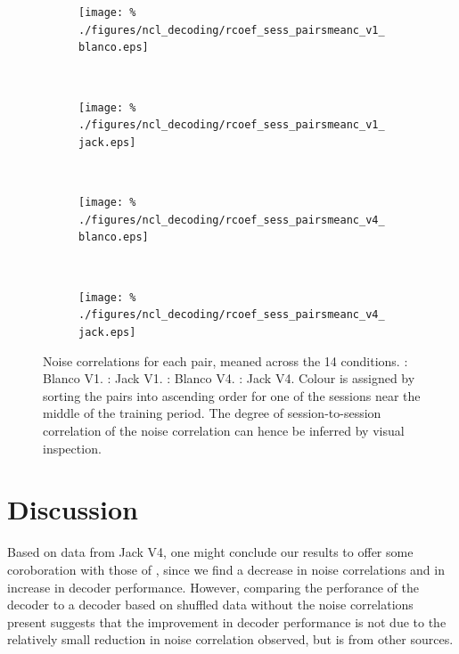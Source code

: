 \begin{figure}[htbp]
    \begin{subfigure}[b]{0.5\linewidth}
        \centering
        \caption{}
        \label{fig:noise_r_b1_pmc}
        \texttt{[image: \%
./figures/ncl\_decoding/rcoef\_sess\_pairsmeanc\_v1\_blanco.eps]}
    \end{subfigure}
    ~~
    \begin{subfigure}[b]{0.5\linewidth}
        \centering
        \caption{}
        \label{fig:noise_r_j1_pmc}
        \texttt{[image: \%
./figures/ncl\_decoding/rcoef\_sess\_pairsmeanc\_v1\_jack.eps]}
    \end{subfigure}
    \\
    \begin{subfigure}[b]{0.5\linewidth}
        \centering
        \caption{}
        \label{fig:noise_r_b4_pmc}
        \texttt{[image: \%
./figures/ncl\_decoding/rcoef\_sess\_pairsmeanc\_v4\_blanco.eps]}
    \end{subfigure}
    ~~
    \begin{subfigure}[b]{0.5\linewidth}
        \centering
        \caption{}
        \label{fig:noise_r_j4_pmc}
        \texttt{[image: \%
./figures/ncl\_decoding/rcoef\_sess\_pairsmeanc\_v4\_jack.eps]}
    \end{subfigure}
    \caption{Noise correlations for each pair, meaned across the 14 conditions.
\protect{}: Blanco V1.
\protect{}: Jack V1.
\protect{}: Blanco V4.
\protect{}: Jack V4.
Colour is assigned by sorting the pairs into ascending order for one of the sessions near the middle of the training period.
The degree of session-to-session correlation of the noise correlation can hence be inferred by visual inspection.
}
    \label{fig:noise_r_pmc}
\end{figure}


\clearpage
\section{Discussion}

Based on data from Jack V4, one might conclude our results to offer some coroboration with those of \citet{Gu2011}, since we find a decrease in noise correlations and in increase in decoder performance. However, comparing the perforance of the decoder to a decoder based on shuffled data without the noise correlations present suggests that the improvement in decoder performance is not due to the relatively small reduction in noise correlation observed, but is from other sources.

